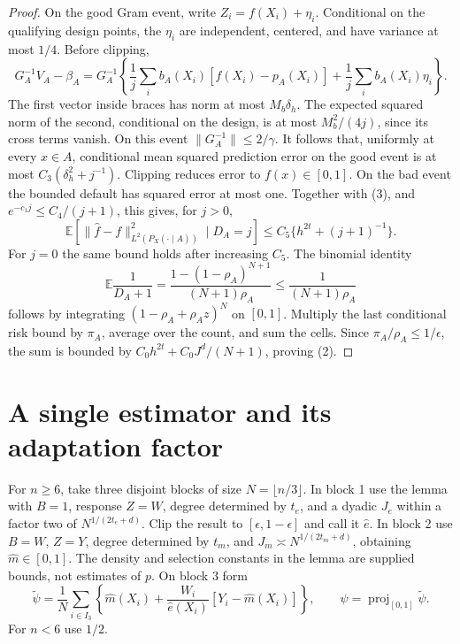 \documentclass[11pt]{article}
\theoremstyle{remark}
\newcommand{\E}{\mathbb E}
\begin{document}
\begin{proof}
On the good Gram event, write $Z_i=f(X_i)+\eta_i$. Conditional on the
qualifying design points, the $\eta_i$ are independent, centered, and
have variance at most $1/4$. Before clipping,
\[
 G_A^{-1}V_A-\beta_A
 =G_A^{-1}\left\{\frac1j\sum_i b_A(X_i)[f(X_i)-p_A(X_i)]
                      +\frac1j\sum_i b_A(X_i)\eta_i\right\}.
\]
The first vector inside braces has norm at most $M_b\delta_h$.
The expected squared norm of the second, conditional on the design, is
at most $M_b^2/(4j)$, since its cross terms vanish. On this event
$\|G_A^{-1}\|\le2/\gamma$. It follows that, uniformly at every $x\in A$,
conditional mean squared prediction error on the good event is at most
$C_3(\delta_h^2+j^{-1})$. Clipping reduces error to $f(x)\in[0,1]$.
On the bad event the bounded default has squared error at most one.
Together with (3), and $e^{-c_1j}\le C_4/(j+1)$, this gives, for $j>0$,
\[
 \E[\|\widehat f-f\|_{L^2(P_X(\cdot\mid A))}^2\mid D_A=j]
 \le C_5\{h^{2t}+(j+1)^{-1}\}.
\]
For $j=0$ the same bound holds after increasing $C_5$.
The binomial identity
\[
 \E\frac1{D_A+1}
 =\frac{1-(1-\rho_A)^{N+1}}{(N+1)\rho_A}
 \le\frac1{(N+1)\rho_A}
\]
follows by integrating $(1-\rho_A+\rho_A z)^N$ on $[0,1]$.
Multiply the last conditional risk bound by $\pi_A$, average over the
count, and sum the cells. Since $\pi_A/\rho_A\le1/\epsilon$, the sum
is bounded by $C_0h^{2t}+C_0J^d/(N+1)$, proving (2).
\end{proof}

\section{A single estimator and its adaptation factor}
For $n\ge6$, take three disjoint blocks of size $N=\lfloor n/3\rfloor$.
In block 1 use the lemma with $B=1$, response $Z=W$, degree determined
by $t_e$, and a dyadic $J_e$ within a factor two of
$N^{1/(2t_e+d)}$. Clip the result to $[\epsilon,1-\epsilon]$ and call it
$\widehat e$. In block 2 use $B=W$, $Z=Y$, degree determined by $t_m$,
and $J_m\asymp N^{1/(2t_m+d)}$, obtaining $\widehat m\in[0,1]$.
The density and selection constants in the lemma are supplied bounds,
not estimates of $p$. On block 3 form
\[
 \widetilde\psi=\frac1N\sum_{i\in I_3}
 \left\{\widehat m(X_i)+\frac{W_i}{\widehat e(X_i)}
                    [Y_i-\widehat m(X_i)]\right\},
 \qquad \widehat\psi=\operatorname{proj}_{[0,1]}\widetilde\psi.
                                                               \tag{4}
\]
For $n<6$ use $1/2$.
\end{document}
